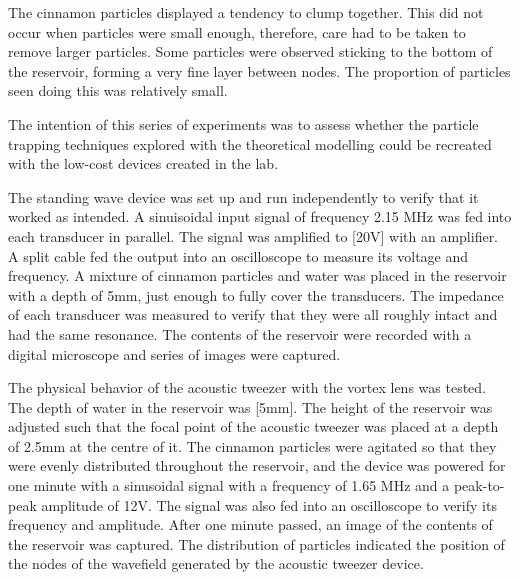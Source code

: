 \documentclass[11pt,a4paper]{article}
\begin{document}
The cinnamon particles displayed a tendency to clump together. This did not occur when particles were small enough, therefore, care had to be taken to remove larger particles. Some particles were observed sticking to the bottom of the reservoir, forming a very fine layer between nodes. The proportion of particles seen doing this was relatively small.


The intention of this series of experiments was to assess whether the particle trapping techniques explored with the theoretical modelling could be recreated with the low-cost devices created in the lab. 

The standing wave device was set up and run independently to verify that it worked as intended. A sinuisoidal input signal of frequency 2.15 MHz was fed into each transducer in parallel. The signal was amplified to [20V] with an amplifier. A split cable fed the output into an oscilloscope to measure its voltage and frequency. A mixture of cinnamon particles and water was placed in the reservoir with a depth of 5mm, just enough to fully cover the transducers. The impedance of each transducer was measured to verify that they were all roughly intact and had the same resonance. The contents of the reservoir were recorded with a digital microscope and series of images were captured.

The physical behavior of the acoustic tweezer with the vortex lens was tested. The depth of water in the reservoir was [5mm]. The height of the reservoir was adjusted such that the focal point of the acoustic tweezer was placed at a depth of 2.5mm at the centre of it. The cinnamon particles were agitated so that they were evenly distributed throughout the reservoir, and the device was powered for one minute with a sinusoidal signal with a frequency of 1.65 MHz and a peak-to-peak amplitude of 12V. The signal was also fed into an oscilloscope to verify its frequency and amplitude. After one minute passed, an image of the contents of the reservoir was captured. The distribution of particles indicated the position of the nodes of the wavefield generated by the acoustic tweezer device.
\end{document}
